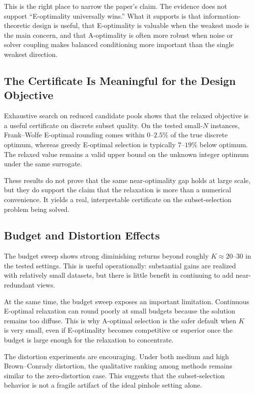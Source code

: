 \documentclass[11pt]{article}
\begin{document}
This is the right place to narrow the paper's claim. The evidence does not
support ``E-optimality universally wins.'' What it supports is that
information-theoretic design is useful, that E-optimality is valuable when the
weakest mode is the main concern, and that A-optimality is often more robust
when noise or solver coupling makes balanced conditioning more important than
the single weakest direction.

\subsection{The Certificate Is Meaningful for the Design Objective}
Exhaustive search on reduced candidate pools shows that the relaxed objective is
a useful certificate on discrete subset quality. On the tested small-$N$
instances, Frank--Wolfe E-optimal rounding comes within $0$--$2.5\%$ of the
true discrete optimum, whereas greedy E-optimal selection is typically
$7$--$19\%$ below optimum. The relaxed value remains a valid upper bound on the
unknown integer optimum under the same surrogate.

These results do not prove that the same near-optimality gap holds at large
scale, but they do support the claim that the relaxation is more than a
numerical convenience. It yields a real, interpretable certificate on the
subset-selection problem being solved.

\subsection{Budget and Distortion Effects}
The budget sweep shows strong diminishing returns beyond roughly
$K \approx 20$--$30$ in the tested settings. This is useful operationally:
substantial gains are realized with relatively small datasets, but there is
little benefit in continuing to add near-redundant views.

At the same time, the budget sweep exposes an important limitation. Continuous
E-optimal relaxation can round poorly at small budgets because the solution
remains too diffuse. This is why A-optimal selection is the safer default when
$K$ is very small, even if E-optimality becomes competitive or superior once
the budget is large enough for the relaxation to concentrate.

The distortion experiments are encouraging. Under both medium and high
Brown--Conrady distortion, the qualitative ranking among methods remains similar
to the zero-distortion case. This suggests that the subset-selection behavior is
not a fragile artifact of the ideal pinhole setting alone.
\end{document}

